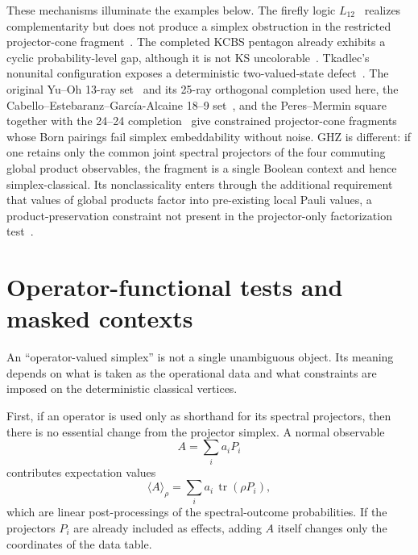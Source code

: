 \documentclass[aps,pra,twocolumn,superscriptaddress,nofootinbib]{revtex4-2}
\newcommand{\tr}{\operatorname{tr}}
\begin{document}
These mechanisms illuminate the examples below.  The firefly logic \(L_{12}\)~\cite{cohen} realizes complementarity but does not produce a simplex obstruction in the restricted projector-cone fragment~\cite{schaller-92,svozil-2018-b}.  The completed KCBS pentagon already exhibits a cyclic probability-level gap, although it is not KS uncolorable~\cite{Klyachko-2008,wright:pent}.  Tkadlec's nonunital configuration exposes a deterministic two-valued-state defect~\cite{tkadlec-96}.  The original Yu--Oh 13-ray set~\cite{Yu-2012} and its 25-ray orthogonal completion used here, the Cabello--Estebaranz--Garc\'ia-Alcaine 18--9 set~\cite{cabello-96}, and the Peres--Mermin square together with the 24--24 completion~\cite{peres111,mermin90b,peres-91,Pavicic-2005,svozil-2024-convert-pra-externalfigures} give constrained projector-cone fragments whose Born pairings fail simplex embeddability without noise.  GHZ is different: if one retains only the common joint spectral projectors of the four commuting global product observables, the fragment is a single Boolean context and hence simplex-classical.  Its nonclassicality enters through the additional requirement that values of global products factor into pre-existing local Pauli values, a product-preservation constraint not present in the projector-only factorization test~\cite{ghz,mermin90b,svozil-2024-convert-pra-externalfigures}.


\section{Operator-functional tests and masked contexts}
\label{sec:operator-valued}

An ``operator-valued simplex'' is not a single unambiguous object.  Its meaning depends on what is taken as the operational data and what constraints are imposed on the deterministic classical vertices.

First, if an operator is used only as shorthand for its spectral projectors, then there is no essential change from the projector simplex.  A normal observable
\begin{equation}
        A=\sum_i a_iP_i
\end{equation}
contributes expectation values
\begin{equation}
        \langle A\rangle_\rho=\sum_i a_i\,\tr(\rho P_i),
\end{equation}
which are linear post-processings of the spectral-outcome probabilities.  If the projectors $P_i$ are already included as effects, adding $A$ itself changes only the coordinates of the data table.
\end{document}
